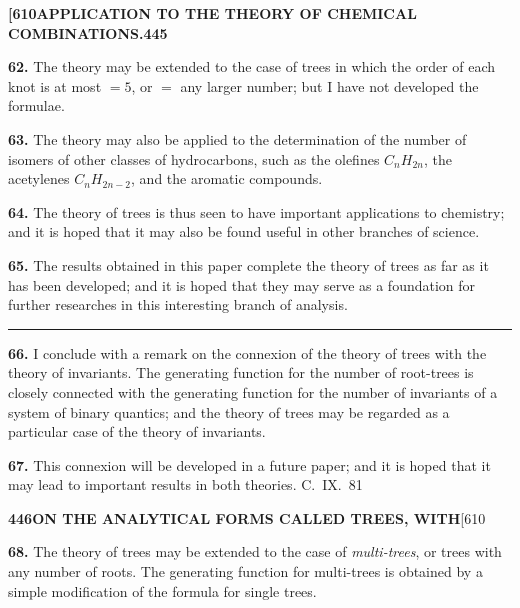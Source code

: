\documentclass[11pt,a4paper]{book}
\begin{document}
{\newpage
\noindent\textbf{[610}\hspace{\fill}\textbf{APPLICATION TO THE THEORY OF CHEMICAL COMBINATIONS.}\hspace{\fill}\textbf{445}

\noindent\textbf{62.}
The theory may be extended to the case of trees in which the order of each knot is at most $=5$, or $=$ any larger number; but I have not developed the formulae.

\medskip
\noindent\textbf{63.}
The theory may also be applied to the determination of the number of isomers of other classes of hydrocarbons, such as the olefines $C_nH_{2n}$, the acetylenes $C_nH_{2n-2}$, and the aromatic compounds.

\medskip
\noindent\textbf{64.}
The theory of trees is thus seen to have important applications to chemistry; and it is hoped that it may also be found useful in other branches of science.

\medskip
\noindent\textbf{65.}
The results obtained in this paper complete the theory of trees as far as it has been developed; and it is hoped that they may serve as a foundation for further researches in this interesting branch of analysis.

\bigskip
\begin{center}
\rule{0.5\textwidth}{0.4pt}
\end{center}

\medskip
\noindent\textbf{66.}
I conclude with a remark on the connexion of the theory of trees with the theory of invariants. The generating function for the number of root-trees is closely connected with the generating function for the number of invariants of a system of binary quantics; and the theory of trees may be regarded as a particular case of the theory of invariants.

\medskip
\noindent\textbf{67.}
This connexion will be developed in a future paper; and it is hoped that it may lead to important results in both theories.
\hfill C.~IX.\ 81

\newpage
\noindent\textbf{446}\hspace{\fill}\textbf{ON THE ANALYTICAL FORMS CALLED TREES, WITH}\hspace{\fill}[610

\noindent\textbf{68.}
The theory of trees may be extended to the case of \textit{multi-trees}, or trees with any number of roots. The generating function for multi-trees is obtained by a simple modification of the formula for single trees.

}
\end{document}
